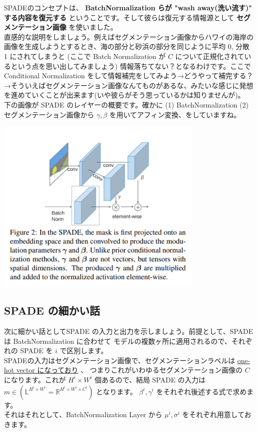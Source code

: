 \documentclass[a4paper, dvipdfmx, 10pt]{article}
\begin{document}
SPADEのコンセプトは、 \textbf{\textbf{BatchNormalization らが "wash away(洗い流す)"  する内容を復元する}} ということです。そして彼らは復元する情報源として \textbf{\textbf{セグメンテーション画像}} を使いました。\\

直感的な説明をしましょう。例えばセグメンテーション画像からハワイの海岸の画像を生成しようとするとき、海の部分と砂浜の部分を同じように平均 0,  分散 1 にされてしまうと (ここで Batch Normalization が \(C\) について正規化されているという点を思い出してみましょう) 情報落ちてない？となるわけです。ここで Conditional Normalization をして情報補完をしてみよう→どうやって補完する？→そういえばセグメンテーション画像なんてものがあるな、みたいな感じに発想を進めていくことが出来ます(いや彼らがそう思っているかは知りませんが)。\\

下の画像が SPADE のレイヤーの概要です。確かに (1) BatchNormalization (2) セグメンテーション画像から \(\gamma, \beta\) を用いてアフィン変換、をしていますね。\\
\begin{center}
\includegraphics[width=10cm]{./spade_abst.png}
\end{center}

\subsection{SPADE の細かい話}
\label{sec:org55fb4c6}
次に細かい話としてSPADE の入力と出力を示しましょう。前提として、SPADE は BatchNormalization に合わせて モデルの複数ヶ所に適用されるので、それぞれの SPADE を \(i\) で区別します。\\

SPADEの入力はセグメンテーション画像で、セグメンテーションラベルは \href{https://github.com/NVlabs/SPADE/issues/29}{one-hot vector になっており} 、 つまりこれがいわゆるセグメンテーション画像の \(C\) になります。これが \(H^{i} \times W^{i}\) 個あるので、結局 SPADE の入力は　\(m\in (\mathbb{L}^{H^{i}\times W^{i}} = \mathbb{R}^{H^{i} \times W^{i} \times C^{i}})\) となります。 \(\beta^{i}, \gamma^{i}\) をそれぞれ後述する式で求めます。\\
それはそれとして、BatchNormalization Layer から \(\mu^{i}, \sigma^{i}\) をそれぞれ用意しておきます。\\
\end{document}
